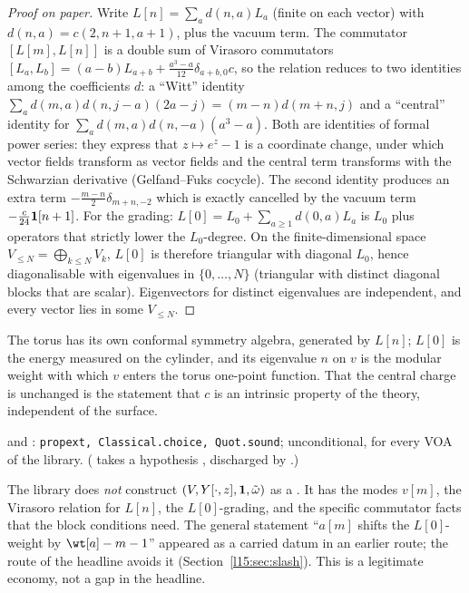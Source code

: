 \begin{proof}[Proof on paper]
Write $L[n]=\sum_a d(n,a)L_a$ (finite on each vector) with $d(n,a)=c(2,n+1,a+1)$, plus the vacuum term. The commutator
$[L[m],L[n]]$ is a double sum of Virasoro commutators $[L_a,L_b]=(a-b)L_{a+b}+\frac{a^3-a}{12}\delta_{a+b,0}c$, so the
relation reduces to two identities among the coefficients $d$: a ``Witt'' identity
$\sum_a d(m,a)d(n,j-a)(2a-j)=(m-n)d(m+n,j)$ and a ``central'' identity for $\sum_a d(m,a)d(n,-a)(a^3-a)$. Both are
identities of formal power series: they express that $z\mapsto e^z-1$ is a coordinate change, under which vector fields
transform as vector fields and the central term transforms with the Schwarzian derivative (Gelfand--Fuks cocycle). The
second identity produces an extra term $-\frac{m-n}{2}\delta_{m+n,-2}$ which is exactly cancelled by the vacuum term
$-\frac c{24}\mathbf{1}[n+1]$. For the grading: $L[0]=L_0+\sum_{a\ge1}d(0,a)L_a$ is $L_0$ plus operators that strictly
lower the $L_0$-degree. On the finite-dimensional space $V_{\le N}=\bigoplus_{k\le N}V_k$, $L[0]$ is therefore triangular
with diagonal $L_0$, hence diagonalisable with eigenvalues in $\{0,\dots,N\}$ (triangular with distinct diagonal blocks
that are scalar). Eigenvectors for distinct eigenvalues are independent, and every vector lies in some $V_{\le N}$.
\end{proof}

\begin{physics}
The torus has its own conformal symmetry algebra, generated by $L[n]$; $L[0]$ is the energy measured on the cylinder,
and its eigenvalue $n$ on $v$ is the modular weight with which $v$ enters the torus one-point function. That the central
charge is unchanged is the statement that $c$ is an intrinsic property of the theory, independent of the surface.
\end{physics}

\begin{status}
 and \allowbreak{}: \texttt{propext, Classical.choice, Quot.sound};
unconditional, for every VOA of the library. ( takes a hypothesis
, discharged by .)
\end{status}

\begin{remark}\label{l15:rem:secondvoa}
The library does \emph{not} construct $(V,Y[\cdot,z],\mathbf{1},\tilde\omega)$ as a . It has
the modes $v[m]$, the Virasoro relation for $L[n]$, the $L[0]$-grading, and the specific commutator facts that the block
conditions need. The general statement ``$a[m]$ shifts the $L[0]$-weight by $\wt[a]-m-1$'' appeared as a carried datum
 in an earlier route; the route of the headline avoids it (Section~\ref{l15:sec:slash}). This is a
legitimate economy, not a gap in the headline.
\end{remark}

